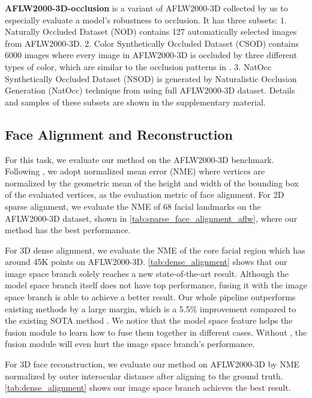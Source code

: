 \documentclass[10pt,twocolumn,letterpaper]{article}
\begin{document}
\textbf{AFLW2000-3D-occlusion} is a variant of AFLW2000-3D collected by us to especially evaluate a model's robustness to occlusion. It has three subsets: 1. Naturally Occluded Dataset (NOD) contains 127 automatically selected images from AFLW2000-3D. 2. Color Synthetically Occluded Dataset (CSOD) contains 6000 images where every image in AFLW2000-3D is occluded by three different types of color, which are similar to the occlusion patterns in \cite{tiwari2022occlusion}. 3. NatOcc Synthetically Occluded Dataset (NSOD) is generated by Naturalistic Occlusion Generation (NatOcc) technique from \cite{voo2022delving} using full AFLW2000-3D dataset. Details and samples of these subsets are shown in the supplementary material.


\subsection{Face Alignment and Reconstruction}
For this task, we evaluate our method on the AFLW2000-3D benchmark. Following \cite{zhu2016face}, we adopt normalized mean error (NME) where vertices are normalized by the geometric mean of the height and width of the bounding box of the evaluated vertices, as the evaluation metric of face alignment. 
For 2D sparse alignment, we evaluate the NME of 68 facial landmarks on the AFLW2000-3D dataset, shown in \cref{tab:sparse_face_alignment_aflw}, where our method has the best performance.

For 3D dense alignment, we evaluate the NME of the core facial region which has around 45K points on AFLW2000-3D. \cref{tab:dense_alignment} shows that our image space branch solely reaches a new state-of-the-art result. Although the model space branch itself does not have top performance, fusing it with the image space branch is able to achieve a better result. Our whole pipeline outperforms existing methods by a large margin, which is a 5.5\% improvement compared to the existing SOTA method \cite{ruan2021sadrnet}. We notice that the model space feature  helps the fusion module to learn how to fuse them together in different cases. Without , the fusion module will even hurt the image space branch's performance.


For 3D face reconstruction, we evaluate our method on AFLW2000-3D by NME normalized by outer interocular distance after aligning to the ground truth. 
\cref{tab:dense_alignment} shows our image space branch achieves the best result.
\end{document}
